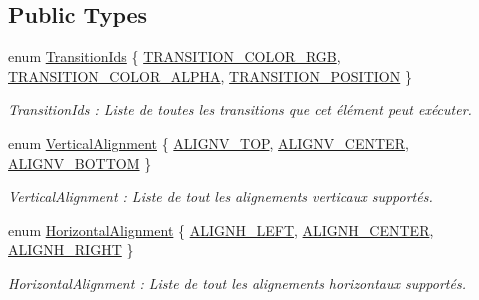 \subsection*{Public Types}
\begin{DoxyCompactItemize}
\item 
enum \hyperlink{classns_gui_1_1_text_a5fa355035f5afc9c896fa8138c29ea09}{Transition\+Ids} \{ \hyperlink{classns_gui_1_1_text_a5fa355035f5afc9c896fa8138c29ea09a91cb0804f8ea9e7353a36a52d89fc492}{T\+R\+A\+N\+S\+I\+T\+I\+O\+N\+\_\+\+C\+O\+L\+O\+R\+\_\+\+R\+GB}, 
\hyperlink{classns_gui_1_1_text_a5fa355035f5afc9c896fa8138c29ea09a508f66b682f94f547d3f56062aa1fb3f}{T\+R\+A\+N\+S\+I\+T\+I\+O\+N\+\_\+\+C\+O\+L\+O\+R\+\_\+\+A\+L\+P\+HA}, 
\hyperlink{classns_gui_1_1_text_a5fa355035f5afc9c896fa8138c29ea09a83fc6bac538e3af4f423c8a4cd0585b8}{T\+R\+A\+N\+S\+I\+T\+I\+O\+N\+\_\+\+P\+O\+S\+I\+T\+I\+ON}
 \}\begin{DoxyCompactList}\small\item\em Transition\+Ids \+: Liste de toutes les transitions que cet élément peut exécuter. \end{DoxyCompactList}
\item 
enum \hyperlink{classns_gui_1_1_text_a3b0b5071a55982d5612c457a832f80fa}{Vertical\+Alignment} \{ \hyperlink{classns_gui_1_1_text_a3b0b5071a55982d5612c457a832f80faa3cfba6c9f9e078a9fcd6c4133ecb4c30}{A\+L\+I\+G\+N\+V\+\_\+\+T\+OP}, 
\hyperlink{classns_gui_1_1_text_a3b0b5071a55982d5612c457a832f80faa37d3b49647821b7b1808dcd159867a45}{A\+L\+I\+G\+N\+V\+\_\+\+C\+E\+N\+T\+ER}, 
\hyperlink{classns_gui_1_1_text_a3b0b5071a55982d5612c457a832f80faace396f1024afc2c37173ea637856e25f}{A\+L\+I\+G\+N\+V\+\_\+\+B\+O\+T\+T\+OM}
 \}\begin{DoxyCompactList}\small\item\em Vertical\+Alignment \+: Liste de tout les alignements verticaux supportés. \end{DoxyCompactList}
\item 
enum \hyperlink{classns_gui_1_1_text_a78bb37c174a4f37eec2b7d69459ee7dc}{Horizontal\+Alignment} \{ \hyperlink{classns_gui_1_1_text_a78bb37c174a4f37eec2b7d69459ee7dca7b5a51aac14cb50d1840e3f3de485ac2}{A\+L\+I\+G\+N\+H\+\_\+\+L\+E\+FT}, 
\hyperlink{classns_gui_1_1_text_a78bb37c174a4f37eec2b7d69459ee7dca79703335d1d5367bd5ee2387413c17a9}{A\+L\+I\+G\+N\+H\+\_\+\+C\+E\+N\+T\+ER}, 
\hyperlink{classns_gui_1_1_text_a78bb37c174a4f37eec2b7d69459ee7dca464315bc1bcc242334d76eb8b0d1e8f6}{A\+L\+I\+G\+N\+H\+\_\+\+R\+I\+G\+HT}
 \}\begin{DoxyCompactList}\small\item\em Horizontal\+Alignment \+: Liste de tout les alignements horizontaux supportés. \end{DoxyCompactList}
\end{DoxyCompactItemize}
